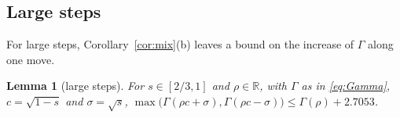 \documentclass[12pt]{amsart}
\newtheorem{lemma}[theorem]{Lemma}
\theoremstyle{definition}
\numberwithin{equation}{section}
\newcommand{\R}{\mathbb{R}}
\newcommand{\leanmap}[1]{\ignorespaces}
\newcommand{\mapnote}[1]{\ignorespaces}
\begin{document}
\subsection{Large steps}\label{subsec:large}
For large steps, Corollary~\ref{cor:mix}(b) leaves a bound on the increase of $\Gamma$ along one move.

\begin{lemma}[large steps]\label{lem:large}
\leanmap{RegretKappa.UpperSharp.large_step_sharp, RegretKappa.UpperSharp.psi_le, RegretKappa.UpperSharp.piece_bound}
\mapnote{Lean proves it in the normalization $\Gamma/2$ ($2.7053/2$), with one theorem for each piece (\lname{RegretKappa.UpperSharp.piece_1} to \lname{RegretKappa.UpperSharp.piece_22}).}
For $s\in[2/3,1]$ and $\rho\in\R$, with $\Gamma$ as in \eqref{eq:Gamma}, $c=\sqrt{1-s}$ and $\sigma=\sqrt s$, $\max\bigl(\Gamma(\rho c+\sigma),\Gamma(\rho c-\sigma)\bigr)\le\Gamma(\rho)+2.7053$.
\end{lemma}
\end{document}
